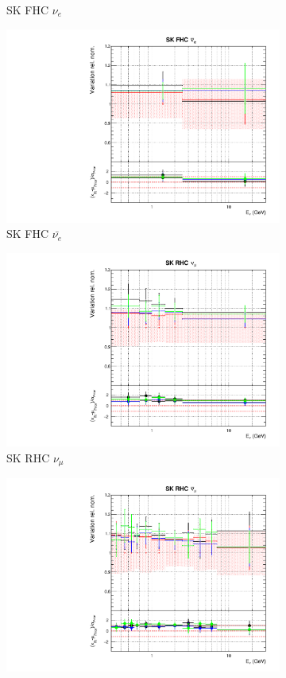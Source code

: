 \begin{figure}[t]
\begin{subfigure}{0.24\textwidth}
  \caption{SK FHC $\nu_e$}
\end{subfigure}
\begin{subfigure}{0.24\textwidth}
  \centering
  \includegraphics[width=0.95\linewidth]{figs/detcovbinflux_11}
  \caption{SK FHC $\bar{\nu_{e}}$}
\end{subfigure}
\begin{subfigure}{0.24\textwidth}
  \centering
  \includegraphics[width=0.95\linewidth]{figs/detcovbinflux_12}
  \caption{SK RHC $\nu_{\mu}$}
\end{subfigure}
\begin{subfigure}{0.24\textwidth}
  \centering
  \includegraphics[width=0.95\linewidth]{figs/detcovbinflux_13}

\end{subfigure}
\end{figure}

